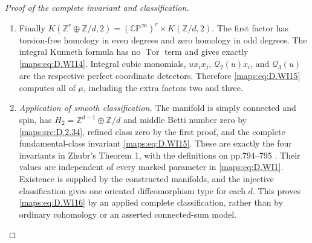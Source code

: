 \begin{proof}[Proof of the complete invariant and classification]
\begin{enumerate}[label=\arabic*.,leftmargin=*]
\item Finally
$K(\mathbb Z^r\oplus\mathbb Z/d,2)
 =(\mathbb {CP}^{\infty})^r\times K(\mathbb Z/d,2)$.
The first factor has torsion-free homology in even
degrees and zero homology in odd degrees. The integral
Kunneth formula has no $\operatorname{Tor}$ term and
gives exactly \eqref{maps:eq:D.WI14}. Integral cubic monomials,
$u x_i x_j$, $\mathcal Q_2(u)x_i$, and
$\mathcal Q_3(u)$ are the respective perfect coordinate
detectors. Therefore \eqref{maps:eq:D.WI15} computes all of $\mu$,
including the extra factors two and three.

\item \emph{Application of smooth classification.}
The manifold is simply connected and spin, has
$H_2=\mathbb Z^{d-1}\oplus\mathbb Z/d$ and middle Betti
number zero by \ref{maps:src:D.2.34}, refined class zero by the first
proof, and the complete fundamental-class invariant
\eqref{maps:eq:D.WI15}. These are exactly the four invariants in
Zhubr's Theorem 1, with the definitions on pp.794--795
\cite[Theorem 1]{manZhubr75}. Their values are independent
of every marked parameter in \eqref{maps:eq:D.WI1}.
Existence is supplied by the constructed manifolds,
and the injective classification gives one oriented
diffeomorphism type for each $d$. This proves \eqref{maps:eq:D.WI16}
by an applied complete classification, rather than by
ordinary cohomology or an asserted connected-sum model.
\end{enumerate}
\end{proof}



